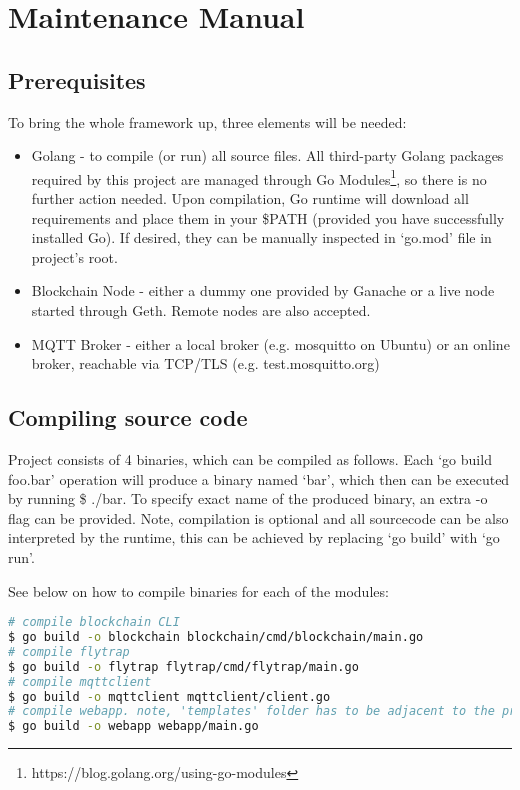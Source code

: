 \chapter{Maintenance Manual}
\section{Prerequisites}
To bring the whole framework up, three elements will be needed:
\begin{itemize}
  \item Golang - to compile (or run) all source files. All third-party Golang packages required by this project are managed through Go Modules\footnote{https://blog.golang.org/using-go-modules}, so there is no further action needed. Upon compilation, Go runtime will download all requirements and place them in your \$PATH (provided you have successfully installed Go). If desired, they can be manually inspected in `go.mod' file in project's root.
  \item Blockchain Node - either a dummy one provided by Ganache or a live node started through Geth. Remote nodes are also accepted.
  \item MQTT Broker - either a local broker (e.g. mosquitto on Ubuntu) or an online broker, reachable via TCP/TLS (e.g. test.mosquitto.org)
\end{itemize}
\section{Compiling source code}
Project consists of 4 binaries, which can be compiled as follows. Each `go build foo.bar' operation will produce a binary named `bar', which then can be executed by running \$ ./bar. To specify exact name of the produced binary, an extra -o flag can be provided. Note, compilation is optional and all sourcecode can be also interpreted by the runtime, this can be achieved by replacing `go build' with `go run'.

See below on how to compile binaries for each of the modules:
\begin{lstlisting}[language=bash,breaklines=true]
# compile blockchain CLI 
$ go build -o blockchain blockchain/cmd/blockchain/main.go 
# compile flytrap
$ go build -o flytrap flytrap/cmd/flytrap/main.go
# compile mqttclient 
$ go build -o mqttclient mqttclient/client.go
# compile webapp. note, 'templates' folder has to be adjacent to the produced binary when it is executed 
$ go build -o webapp webapp/main.go 
\end{lstlisting}
